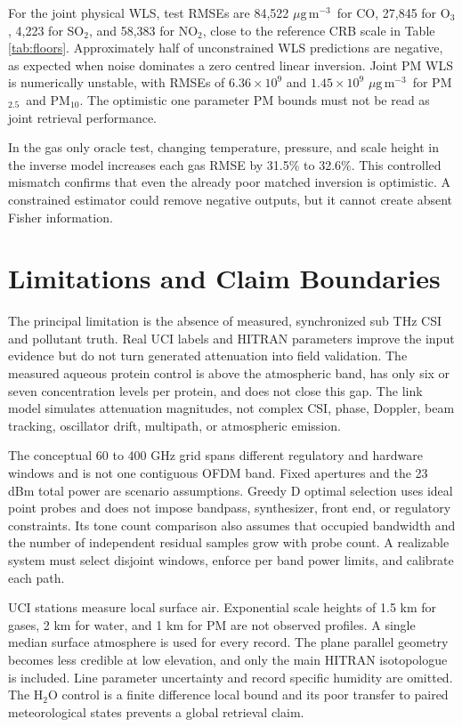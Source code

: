 \documentclass[conference]{IEEEtran}
\newcommand{\ugm}{\ensuremath{\mu\mathrm{g\,m}^{-3}}}
\newcommand{\pmfive}{PM$_{2.5}$}
\newcommand{\pmten}{PM$_{10}$}
\begin{document}
For the joint physical WLS, test RMSEs are 84,522 \ugm\ for CO, 27,845 for O$_3$, 4,223 for SO$_2$, and 58,383 for NO$_2$, close to the reference CRB scale in Table \ref{tab:floors}. Approximately half of unconstrained WLS predictions are negative, as expected when noise dominates a zero centred linear inversion. Joint PM WLS is numerically unstable, with RMSEs of $6.36\times10^9$ and $1.45\times10^9$ \ugm\ for \pmfive\ and \pmten. The optimistic one parameter PM bounds must not be read as joint retrieval performance.

In the gas only oracle test, changing temperature, pressure, and scale height in the inverse model increases each gas RMSE by 31.5\% to 32.6\%. This controlled mismatch confirms that even the already poor matched inversion is optimistic. A constrained estimator could remove negative outputs, but it cannot create absent Fisher information.

\section{Limitations and Claim Boundaries}

The principal limitation is the absence of measured, synchronized sub THz CSI and pollutant truth. Real UCI labels and HITRAN parameters improve the input evidence but do not turn generated attenuation into field validation. The measured aqueous protein control is above the atmospheric band, has only six or seven concentration levels per protein, and does not close this gap. The link model simulates attenuation magnitudes, not complex CSI, phase, Doppler, beam tracking, oscillator drift, multipath, or atmospheric emission.

The conceptual 60 to 400 GHz grid spans different regulatory and hardware windows and is not one contiguous OFDM band. Fixed apertures and the 23 dBm total power are scenario assumptions. Greedy D optimal selection uses ideal point probes and does not impose bandpass, synthesizer, front end, or regulatory constraints. Its tone count comparison also assumes that occupied bandwidth and the number of independent residual samples grow with probe count. A realizable system must select disjoint windows, enforce per band power limits, and calibrate each path.

UCI stations measure local surface air. Exponential scale heights of 1.5 km for gases, 2 km for water, and 1 km for PM are not observed profiles. A single median surface atmosphere is used for every record. The plane parallel geometry becomes less credible at low elevation, and only the main HITRAN isotopologue is included. Line parameter uncertainty and record specific humidity are omitted. The H$_2$O control is a finite difference local bound and its poor transfer to paired meteorological states prevents a global retrieval claim.
\end{document}
